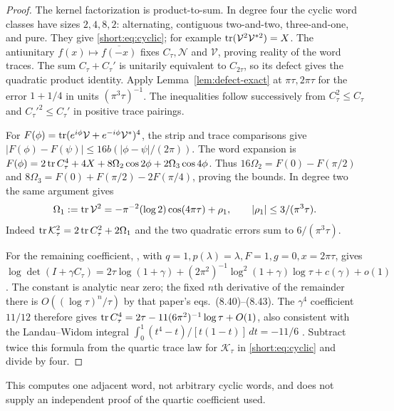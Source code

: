 \begin{proof}
The kernel factorization is product-to-sum.
In degree four the cyclic word classes have sizes $2,4,8,2$:
alternating, contiguous two-and-two, three-and-one, and pure.
They give \eqref{short:eq:cyclic}; for example
$\operatorname{tr}(\mathcal V^2\mathcal V^{*2})=X$.
The antiunitary $f(x)\mapsto\overline{f(-x)}$ fixes $C_\tau,\mathcal N$
and $\mathcal V$, proving reality of the word traces.
The sum $C_\tau+C_\tau'$ is unitarily equivalent to $C_{2\tau}$,
so its defect gives the quadratic product identity.
Apply Lemma~\ref{lem:defect-exact} at $\pi\tau,2\pi\tau$ for the
error $1+1/4$ in units $(\pi^3\tau)^{-1}$.
The inequalities follow successively from $C_\tau^2\le C_\tau$
and $C_\tau'^2\le C_\tau'$ in positive trace pairings.

For $F(\phi)=\operatorname{tr}(e^{i\phi}\mathcal V+e^{-i\phi}\mathcal V^*)^4$,
the strip and trace comparisons give
$|F(\phi)-F(\psi)|\le16b(|\phi-\psi|/(2\pi))$.
The word expansion is
$F(\phi)=2\operatorname{tr} C_\tau^4+4X+8\Omega_2\cos2\phi+2\Omega_3\cos4\phi$.
Thus $16\Omega_2=F(0)-F(\pi/2)$ and
$8\Omega_3=F(0)+F(\pi/2)-2F(\pi/4)$, proving the bounds.
In degree two the same argument gives
\begin{equation}\label{T4:eq:osc1}
\Omega_1:=\operatorname{tr}\mathcal V^2=-\pi^{-2}(\log2)\cos(4\pi\tau)+\rho_1,
\qquad |\rho_1|\le3/(\pi^3\tau).
\end{equation}
Indeed $\operatorname{tr}\mathcal K_\tau^2=2\operatorname{tr} C_\tau^2+2\Omega_1$ and the
two quadratic errors sum to $6/(\pi^3\tau)$.

For the remaining coefficient, \cite[Theorem~2.1]{KitanineEtAl2009},
with $q=1,p(\lambda)=\lambda,F=1,g=0,x=2\pi\tau$, gives
$\log\det(I+\gamma C_\tau)
=2\tau\log(1+\gamma)+(2\pi^2)^{-1}\log^2(1+\gamma)\log\tau
+c(\gamma)+o(1)$.
The constant is analytic near zero; the fixed $n$th derivative of the
remainder there is $O((\log\tau)^n/\tau)$ by that paper's
eqs.~(8.40)--(8.43). The $\gamma^4$ coefficient $11/12$ therefore gives
$\operatorname{tr} C_\tau^4=2\tau-11(6\pi^2)^{-1}\log\tau+O(1)$, also consistent
with the Landau--Widom integral
$\int_0^1(t^4-t)/[t(1-t)]\,dt=-11/6$ \cite[p.~478]{LandauWidom1980}.
Subtract twice this formula from the quartic trace law for
$\mathcal K_\tau$ in \eqref{short:eq:cyclic} and divide by four.
\end{proof}
This computes one adjacent word, not arbitrary cyclic words, and does
not supply an independent proof of the quartic coefficient used.

